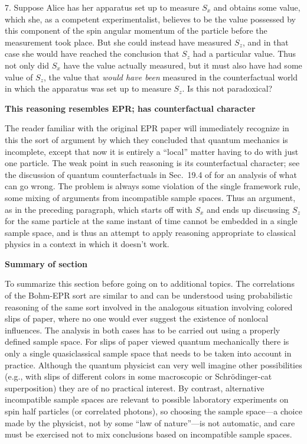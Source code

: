 \documentclass[10pt]{article} %
\def\outl#1{\par{\medskip\noindent\hspace*{.5cm}\bf
      \mathversion{bold}#1\mathversion{normal}\smallskip} }
\def\np{} \def\xa{} \def\xb{} \def\xn{} \def\xp{}
\def\outl#1{} \def\np{} \def\xa{} \def\xb{} \def\xn{} \def\xp{}
\def\outl#1{\par{\medskip\noindent\hspace*{.5cm}\bf
      \mathversion{bold}#1\mathversion{normal}\smallskip} }
\def\np{\newpage }\def\xn{\nopagebreak }\def\xp{\pagebreak }
\begin{document}
7. Suppose Alice has her apparatus set up to measure $S_x$ and obtains
some value, which she, as a competent experimentalist, believes to be the
value possessed by this component of the spin angular momentum of the particle
before the measurement took place.  But she could instead have measured $S_z$,
and in that case she would have reached the conclusion that $S_z$ had a
particular value.  Thus not only did $S_x$ have the value actually measured,
but it must also have had some value of $S_z$, the value that \emph{would have
  been} measured in the counterfactual world in which the apparatus was set up
to measure $S_z$.  Is this not paradoxical?

\xb
\outl{This reasoning resembles EPR; has counterfactual character}
\xa


The reader familiar with the original EPR paper \cite{EnPR35} will immediately
recognize in this the sort of argument by which they concluded that quantum
mechanics is incomplete, except that now it is entirely a ``local'' matter
having to do with just one particle.  The weak point in such reasoning is its
counterfactual character; see the discussion of quantum counterfactuals in
Sec.~19.4 of \cite{Grff02c} for an analysis of what can go wrong. The problem
is always some violation of the single framework rule, some mixing of
arguments from incompatible sample spaces. Thus an argument, as in the
preceding paragraph, which starts off with $S_x$ and ends up discussing $S_z$
for the same particle at the same instant of time cannot be embedded in a
single sample space, and is thus an attempt to apply reasoning appropriate to
classical physics in a context in which it doesn't work.

\xb
\outl{Summary of section}
\xa


To summarize this section before going on to additional topics. The
correlations of the Bohm-EPR sort are similar to and can be understood using
probabilistic reasoning of the same sort involved in the analogous situation
involving colored slips of paper, where no one would ever suggest the
existence of nonlocal influences. The analysis in both cases has to be carried
out using a properly defined sample space.  For slips of paper viewed quantum
mechanically there is only a single quasiclassical sample space that needs to
be taken into account in practice. Although the quantum physicist can very
well imagine other possibilities (e.g., with slips of different colors in some
macroscopic or Schr\"odinger-cat superposition) they are of no practical
interest.  By contrast, alternative incompatible sample spaces are relevant to
possible laboratory experiments on spin half particles (or correlated
photons), so choosing the sample space---a choice made by the physicist, not
by some ``law of nature''---is not automatic, and care must be exercised not
to mix conclusions based on incompatible sample spaces.
\end{document}
